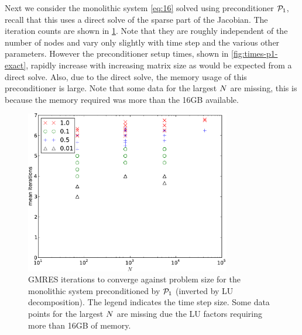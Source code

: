 Next we consider the monolithic system \cref{eq:16} solved using preconditioner $\mathcal{P}_1$, recall that this uses a direct solve of the sparse part of the Jacobian.
The iteration counts are shown in \cref{fig:its-p1-exact}.
Note that they are roughly independent of the number of nodes and vary only slightly with time step and the various other parameters.
However the preconditioner setup times, shown in \cref{fig:times-p1-exact}, rapidly increase with increasing matrix size as would be expected from a direct solve.
Also, due to the direct solve, the memory usage of this preconditioner is large.
Note that some data for the largest $N$ are missing, this is because the memory required was more than the 16GB available.

\begin{figure}
  \centering
  \includegraphics[width=0.8\textwidth]{plots/linear_solvers/som-main-exactimplicitdummy-meanofnsolveritersvsinitialnnode.pdf}
  \caption{
    \newtonmean{}
GMRES iterations to converge against problem size for the monolithic system preconditioned by $\mathcal{P}_1$ (inverted by LU decomposition).
    The legend indicates the time step size.
    \manydatapointsTimeStepLegend{}
Some data points for the largest $N$ are missing due the LU factors requiring more than 16GB of memory.
}
  \label{fig:its-p1-exact}
\end{figure}


